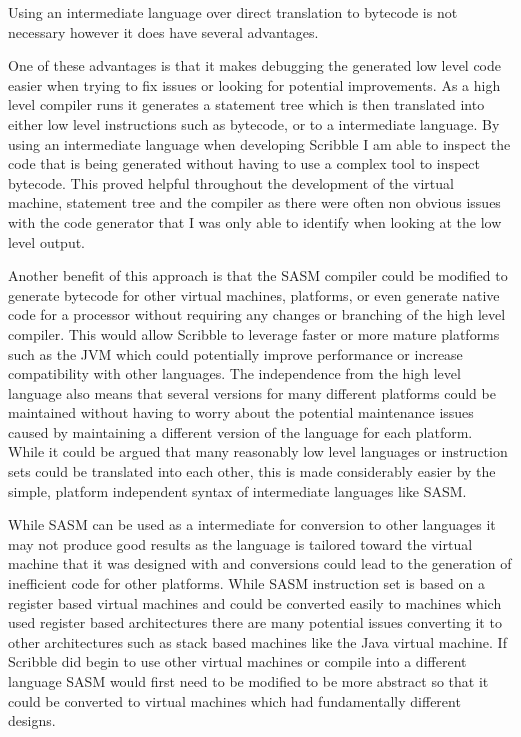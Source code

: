 \documentclass[]{final_report}
\begin{document}
Using an intermediate language over direct translation to bytecode is not necessary however it does have several advantages.

One of these advantages is that it makes debugging the generated low level code easier when trying to fix issues or looking for potential improvements. As a high level compiler runs it generates a statement tree which is then translated into either low level instructions such as bytecode, or to a intermediate language. By using an intermediate language when developing Scribble I am able to inspect the code that is being generated without having to use a complex tool to inspect bytecode. This proved helpful throughout the development of the virtual machine, statement tree and the compiler as there were often non obvious issues with the code generator that I was only able to identify when looking at the low level output.

Another benefit of this approach is that the SASM compiler could be modified to generate bytecode for other virtual machines, platforms, or even generate native code for a processor without requiring any changes or branching of the high level compiler. This would allow Scribble to leverage faster or more mature platforms such as the JVM which could potentially improve performance or increase compatibility with other languages. The independence from the high level language also means that several versions for many different platforms could be maintained without having to worry about the potential maintenance issues caused by maintaining a different version of the language for each platform. While it could be argued that many reasonably low level languages or instruction sets could be translated into each other, this is made considerably easier by the simple, platform independent syntax of intermediate languages like SASM.

While SASM can be used as a intermediate for conversion to other languages it may not produce good results as the language is tailored toward the virtual machine that it was designed with and conversions could lead to the generation of inefficient code for other platforms. While SASM instruction set is based on a register based virtual machines and could be converted easily to machines which used register based architectures there are many potential issues converting it to other architectures such as stack based machines like the Java virtual machine. If Scribble did begin to use other virtual machines or compile into a different language SASM would first need to be modified to be more abstract so that it could be converted to virtual machines which had fundamentally different designs.
\end{document}
